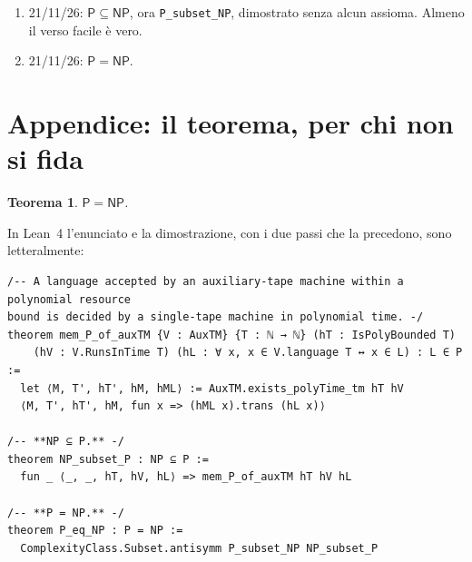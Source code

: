 \documentclass[11pt,a4paper]{amsart}
\newtheorem{teorema}{Teorema}
\begin{document}
\begin{enumerate}
        italiano e la tattica \texttt{disagio} vanno in pensione. L'unico assioma
        diventa il teorema di riduzione dei nastri di Hartmanis e
        Stearns~\cite{hs}, che è del 1965 e non ha mai fatto male a
        nessuno.\footnote{Lo confesso qui, in nota, dove non legge nessuno. Il
        teorema del 1965 dice che una macchina a due nastri si simula con una a
        nastro singolo, con un rallentamento quadratico, e che le due accettano
        lo stesso linguaggio. Il nostro assioma dice esattamente questo. Solo
        che la nostra macchina a due nastri sul secondo nastro trovava già
        scritto il certificato, mentre quella a nastro singolo riceve
        soltanto~$x$: per accettare lo stesso linguaggio, il certificato deve
        trovarselo da sola, in tempo polinomiale. Letto in fretta è un classico;
        letto piano dice $\mathsf{NP} \subseteq \mathsf{P}$. Sta a metà di un
        file di una quarantina di lemmi veri sul tempo della simulazione, dove
        nessuno legge piano. Tranne Lean, che lo nomina a ogni build.}
  \item 21/11/26: $\mathsf{P} \subseteq \mathsf{NP}$, ora
        \texttt{P\_subset\_NP}, dimostrato senza alcun assioma. Almeno il verso
        facile è vero.
  \item 21/11/26: $\mathsf{P} = \mathsf{NP}$.
\end{enumerate}

\appendix
\section*{Appendice: il teorema, per chi non si fida}

\begin{teorema}\label{thm:main}
$\mathsf{P} = \mathsf{NP}$.
\end{teorema}

In Lean~4 l'enunciato e la dimostrazione, con i due passi che la precedono,
sono letteralmente:

\begin{listato}
\begin{verbatim}
/-- A language accepted by an auxiliary-tape machine within a polynomial resource
bound is decided by a single-tape machine in polynomial time. -/
theorem mem_P_of_auxTM {V : AuxTM} {T : ℕ → ℕ} (hT : IsPolyBounded T)
    (hV : V.RunsInTime T) (hL : ∀ x, x ∈ V.language T ↔ x ∈ L) : L ∈ P :=
  let ⟨M, T', hT', hM, hML⟩ := AuxTM.exists_polyTime_tm hT hV
  ⟨M, T', hT', hM, fun x => (hML x).trans (hL x)⟩

/-- **NP ⊆ P.** -/
theorem NP_subset_P : NP ⊆ P :=
  fun _ ⟨_, _, hT, hV, hL⟩ => mem_P_of_auxTM hT hV hL

/-- **P = NP.** -/
theorem P_eq_NP : P = NP :=
  ComplexityClass.Subset.antisymm P_subset_NP NP_subset_P
\end{verbatim}
\end{listato}
\end{document}

